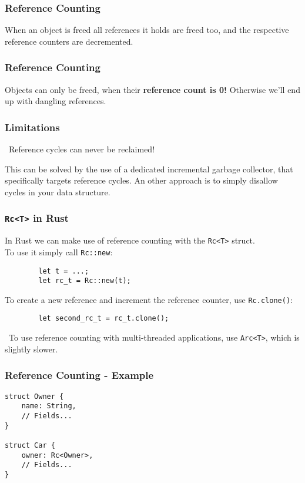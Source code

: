 \documentclass{beamer}
\newcommand{\attention}{{\scalebox{.75}{\bf}}\ }
\begin{document}
\begin{frame}
	\frametitle{Reference Counting}
	When an object is freed all references it holds are freed too, and the respective reference counters are decremented.
	\begin{figure}
		\def\svgwidth{120pt}
		\LARGE
		
	\end{figure}
\end{frame}
\begin{frame}
	\frametitle{Reference Counting}
	Objects can only be freed, when their \textbf{reference count is 0!} Otherwise we'll end up with dangling references.
	\begin{figure}
		\def\svgwidth{120pt}
		\LARGE
		
	\end{figure}
\end{frame}
\begin{frame}
	\frametitle{Limitations}
	\attention Reference cycles can never be reclaimed!
	\begin{figure}
		\def\svgwidth{100pt}
		
	\end{figure}
	This can be solved by the use of a dedicated incremental garbage collector, that specifically targets reference cycles.
	An other approach is to simply disallow cycles in your data structure.
\end{frame}
\begin{frame}[fragile]
	\frametitle{\texttt{Rc<T>} in Rust}
	In Rust we can make use of reference counting with the \texttt{Rc<T>} struct.
	\\
	To use it simply call \texttt{Rc::new}:
	\begin{verbatim}
		let t = ...;
		let rc_t = Rc::new(t);
	\end{verbatim}
	To create a new reference and increment the reference counter, use \texttt{Rc.clone()}:
	\begin{verbatim}
		let second_rc_t = rc_t.clone();
	\end{verbatim}
	\attention To use reference counting with multi-threaded applications, use \texttt{Arc<T>}, which is slightly slower.
\end{frame}
\begin{frame}[fragile]
	\frametitle{Reference Counting - Example}
	\begin{verbatim}
struct Owner {
	name: String,
	// Fields...
}

struct Car {
	owner: Rc<Owner>,
	// Fields...
}
	\end{verbatim}
\end{frame}
\end{document}
